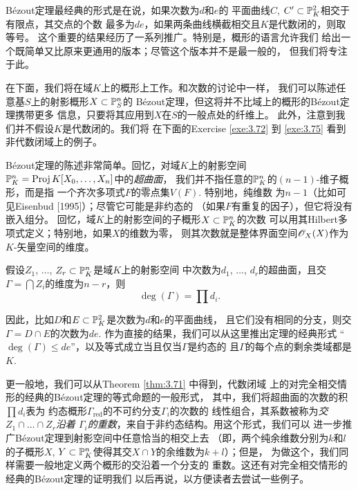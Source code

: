 B\'ezout定理最经典的形式是在说，如果次数为$d$和$e$的
平面曲线$C$, $C'\subset \P_K^2$相交于有限点，其交点的个数
最多为$de$，如果两条曲线横截相交且$K$是代数闭的，则取等号。
这个重要的结果经历了一系列推广。特别是，概形的语言允许我们
给出一个既简单又比原来更通用的版本；尽管这个版本并不是最一般的，
但我们将专注于此。

在下面，我们将在域$K$上的概形上工作。和次数的讨论中一样，
我们可以陈述任意基$S$上的射影概形$X\subset \P_S^n$的
B\'ezout定理，但这将并不比域上的概形的B\'ezout定理携带更多
信息，只要将其应用到$X$在$S$的一般点处的纤维上。
此外，注意到我们并不假设$K$是代数闭的。我们将
在下面的Exercise \ref{exe:3.72} 到 \ref{exe:3.75} 
看到非代数闭域上的例子。


B\'ezout定理的陈述非常简单。回忆，对域$K$上的射影空间
$\P_K^n=\proj K[X_0,\dots,X_n]$中的\textit{超曲面}，
我们并不指任意的$\P_K^n$的$(n-1)$-维子概形，而是指
一个齐次多项式$F$的零点集$V(F)$. 特别地，纯维数
为$n-1$（比如可见Eisenbud [1995]）；尽管它可能是非约态的
（如果$F$有重复的因子），但它将没有嵌入组分。
回忆，域$K$上的射影空间的子概形$X\subset \P_K^n$的次数
可以用其Hilbert多项式定义；特别地，如果$X$的维数为零，
则其次数就是整体界面空间$\oo_X(X)$作为$K$-矢量空间的维度。

\begin{thm}
\label{thm:3.71}
假设$Z_1$, $\dots$, $Z_r\subset \P_K^n$是域$K$上的射影空间
中次数为$d_1$, $\dots$, $d_r$的超曲面，且交
$\Gamma=\bigcap Z_i$的维度为$n-r$，则
\[
	\deg(\Gamma)=\prod d_i.
\]
\end{thm}

因此，比如$D$和$E\subset \P_K^2$是次数为$d$和$e$的平面曲线，
且它们没有相同的分支，则交$\Gamma=D\cap E$的次数为$de$. 
作为直接的结果，我们可以从这里推出定理的经典形式
“$\deg(\Gamma)\leq de$”，以及等式成立当且仅当$\Gamma$是约态的
且$\Gamma$的每个点的剩余类域都是$K$.

更一般地，我们可以从Theorem \ref{thm:3.71} 中得到，代数闭域
上的对完全相交情形的经典的B\'ezout定理的等式命题的一般形式，
其中，我们将超曲面的次数的积$\prod d_i$表为
约态概形$\Gamma_{\text{red}}$的不可约分支$\Gamma_i$的次数的
线性组合，其系数被称为\textit{交$Z_1\cap \dots\cap Z_r$沿着
$\Gamma_i$的重数}，来自于非约态结构。用这个形式，我们可以
进一步推广B\'ezout定理到射影空间中任意恰当的相交上去
（即，两个纯余维数分别为$k$和$l$的子概形$X$, 
$Y\subset \P_K^n$使得其交$X\cap Y$的余维数为$k+l$）；但是，
为做这个，我们同样需要一般地定义两个概形的交沿着一个分支的
重数。这还有对完全相交情形的经典的B\'ezout定理的证明我们
以后再说，以方便读者去尝试一些例子。

